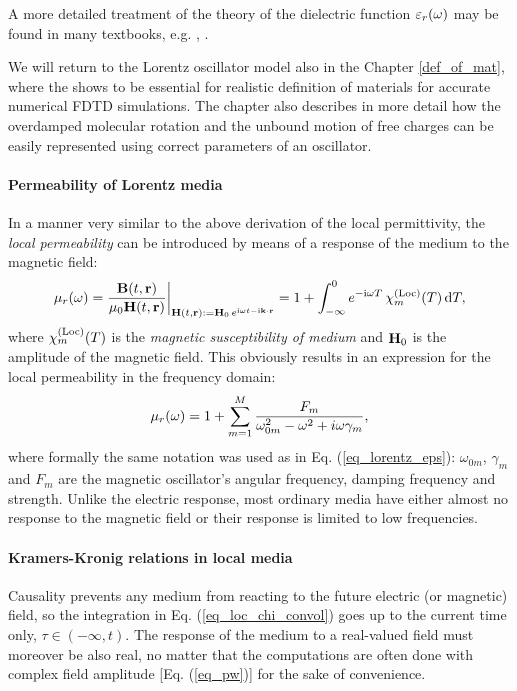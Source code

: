 A more detailed treatment of the theory of the dielectric function $\varepsilon_r(\omega)$ may be found in many textbooks, e.g. \cite[p. 454]{klingshirn2007semiconductor}, \cite{dresselhaus1966optical}. 

We will return to the Lorentz oscillator model also in the Chapter \ref{def_of_mat}, where the shows to be essential for realistic definition of materials for accurate numerical FDTD simulations. The chapter also describes in more detail how the overdamped molecular rotation and the unbound motion of free charges can be easily represented using correct parameters of an oscillator.
\paragraph{Permeability of Lorentz media}  %
In a manner very similar to the above derivation of the local permittivity, the \textit{local permeability} can be introduced by means of a response of the medium to the magnetic field:
\begin{equation} \mu_r(\omega) = \frac{\mathbf{B}(t,{\mathbf{r}})}{\mu_0\mathbf{H}(t,{\mathbf{r}})} \biggr|_{\mathbf{H}(t, {\mathbf{r}}) := \mathbf{H}_0 \, e^{{\mathrm i}\omega t - {\mathrm i}{\mathbf{k}}\cdot{\mathbf{r}}}} = 1 + \int_{-\infty}^{0} e^{-{\mathrm i}\omega T} \,\chi_m^{\rm(Loc)}(T) \,\mbox{d}T, \label{eq_mu_loc}\end{equation}
where $\chi_m^{\rm(Loc)}(T)$ is the \textit{magnetic susceptibility of medium} and $\mathbf{H}_0$ is the amplitude of the magnetic field. This obviously results in an expression for the local permeability in the frequency domain:
\begin{equation} \mu_r(\omega) = 1 + \sum_{m=1}^M \frac{F_m}{\omega_{0m}^2 - \omega^2 + i\omega\gamma_m}, \label{eq_lorentz_mu}\end{equation} %
where formally the same notation was used as in  Eq. (\ref{eq_lorentz_eps}): $\omega_{0m}$, $\gamma_m$ and $F_m$ are the magnetic oscillator's angular frequency, damping frequency and strength. Unlike the electric response, most ordinary media have either almost no response to the magnetic field %
or their response is limited to low frequencies.

\paragraph{Kramers-Kronig relations in local media}%
Causality prevents any medium from reacting to the future electric (or magnetic) field, so the integration in Eq. (\ref{eq_loc_chi_convol}) goes up to the current time only, $\tau \in (-\infty, t)$. The response of the medium to a real-valued field must moreover be also real, no matter that the computations are often done with complex field amplitude [Eq. (\ref{eq_pw})] for the sake of convenience. 

